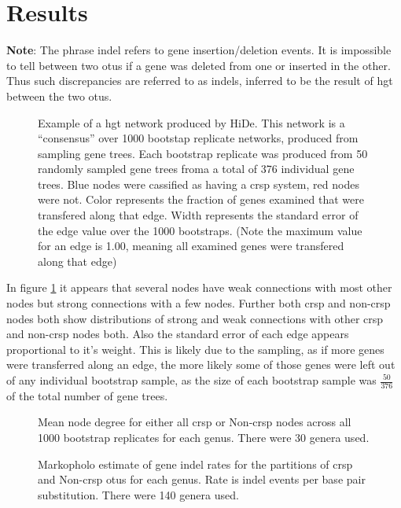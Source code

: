\section{Results}
\textbf{Note}: The phrase indel refers to gene insertion/deletion events. It is impossible to tell between two \ac{otu}s if a gene was deleted from one or inserted in the other.
Thus such discrepancies are referred to as indels, inferred to be the result of \ac{hgt} between the two \ac{otu}s.
\FloatBarrier
\begin{figure}[htb!]
    \caption{Example of a \ac{hgt} network produced by HiDe. This network is a ``consensus'' over 1000 bootstap replicate networks, produced from sampling gene trees. Each bootstrap replicate was produced from 50 randomly sampled gene trees froma a total of 376 individual gene trees. Blue nodes were cassified as having a \ac{crsp} system, red nodes were not. Color represents the fraction of genes examined that were transfered along that edge. Width represents the standard error of the edge value over the 1000 bootstraps. (Note the maximum value for an edge is 1.00, meaning all examined genes were transfered along that edge)}
    \label{net}
\end{figure}
\FloatBarrier
In figure \ref{net} it appears that several nodes have weak connections with most other nodes but strong connections with a few nodes.
Further both \ac{crsp} and non-\ac{crsp} nodes both show distributions of strong and weak connections with other \ac{crsp} and non-\ac{crsp} nodes both.
Also the standard error of each edge appears proportional to it's weight.
This is likely due to the sampling, as if more genes were transferred along an edge, the more likely some of those genes were left out of any individual bootstrap sample, as the size of each bootstrap sample was $\frac{50}{376}$ of the total number of gene trees.
\FloatBarrier
\begin{figure}[htb!]
    \caption{Mean node degree for either all \ac{crsp} or Non-\ac{crsp} nodes across all 1000 bootstrap replicates for each genus. There were 30 genera used.}
    \label{db}
\end{figure}
\FloatBarrier
\FloatBarrier
\begin{figure}[htb!]
    \caption{Markopholo estimate of gene indel rates for the partitions of \ac{crsp} and Non-\ac{crsp} \ac{otu}s for each genus. Rate is indel events per base pair substitution. There were 140 genera used.}
    \label{ib}
\end{figure}
